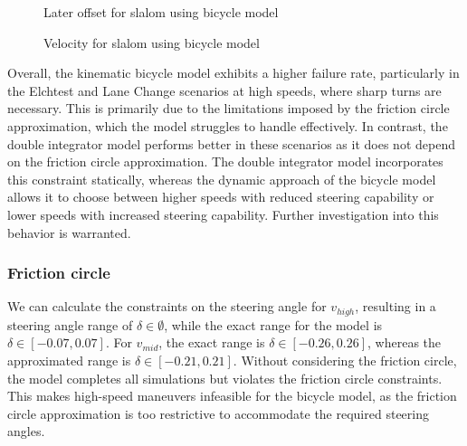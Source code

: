 \begin{figure}[h!]
	\centering
	\caption{Later offset for slalom using bicycle model}
	\label{fig:slalom_bicycle_model_n}
\end{figure}

\begin{figure}[h!]
	\centering
	\caption{Velocity for slalom using bicycle model}
	\label{fig:slalom_bicycle_model_velocity}
\end{figure}

Overall, the kinematic bicycle model exhibits a higher failure rate, particularly in the Elchtest and Lane Change scenarios at high speeds, where
sharp turns are necessary.
This is primarily due to the limitations imposed by the friction circle approximation, which the model struggles to handle effectively.
In contrast, the double integrator model performs better in these scenarios as it does not depend on the friction circle approximation.
The double integrator model incorporates this constraint statically, whereas the dynamic approach of the bicycle model allows it to choose between
higher speeds with reduced steering capability or lower speeds with increased steering capability.
Further investigation into this behavior is warranted.

\subsubsection{Friction	circle}
We can calculate the constraints on the steering angle for $v_{high}$, resulting in a steering angle range of $\delta \in \emptyset$, while the exact
range for the model is $\delta \in [-0.07, 0.07]$.
For $v_{mid}$, the exact range is $\delta \in [-0.26, 0.26]$, whereas the approximated range is $\delta \in [-0.21, 0.21]$.
Without considering the friction circle, the model completes all simulations but violates the friction circle constraints.
This makes high-speed maneuvers infeasible for the bicycle model, as the friction circle approximation is too restrictive to accommodate the required
steering angles.

